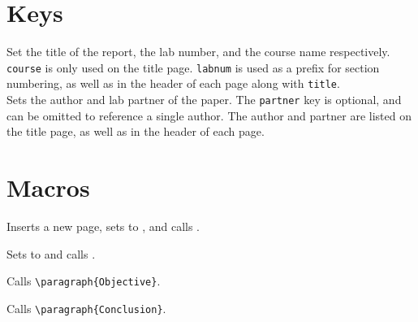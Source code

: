 \documentclass{l3doc}
\begin{document}
\section{Keys}

Set the title of the report, the lab number, and the course name respectively. \texttt{course} is only used on the title page. \texttt{labnum} is used as a prefix for section numbering, as well as in the header of each page along with \texttt{title}.\\

Sets the author and lab partner of the paper. The \texttt{partner} key is optional, and can be omitted to reference a single author. The author and partner are listed on the title page, as well as in the header of each page.\\

\section{Macros}
\begin{function}{\task}
  \begin{syntax}
  \end{syntax}
  Inserts a new page, sets  to , and calls .
\end{function}

\begin{function}{\subtask}
  \begin{syntax}
  \end{syntax}
  Sets  to  and calls .
\end{function}

\begin{function}{\objective}
  Calls \verb|\paragraph{Objective}|.
\end{function}

\begin{function}{\conclusion}
  Calls \verb|\paragraph{Conclusion}|.
\end{function}
\end{document}
